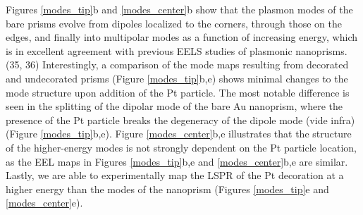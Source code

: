 \documentclass [11pt, proquest] {uwthesis}[2016/11/22]
\begin{document}
Figures \ref{modes_tip}b and \ref{modes_center}b show that the plasmon modes of the bare prisms evolve from dipoles localized to the corners, through those on the edges, and finally into multipolar modes as a function of increasing energy, which is in excellent agreement with previous EELS studies of plasmonic nanoprisms.(35, 36) Interestingly, a comparison of the mode maps resulting from decorated and undecorated prisms (Figure \ref{modes_tip}b,e) shows minimal changes to the mode structure upon addition of the Pt particle. The most notable difference is seen in the splitting of the dipolar mode of the bare Au nanoprism, where the presence of the Pt particle breaks the degeneracy of the dipole mode (vide infra) (Figure \ref{modes_tip}b,e). Figure \ref{modes_center}b,e illustrates that the structure of the higher-energy modes is not strongly dependent on the Pt particle location, as the EEL maps in Figures \ref{modes_tip}b,e and \ref{modes_center}b,e are similar. Lastly, we are able to experimentally map the LSPR of the Pt decoration at a higher energy than the modes of the nanoprism (Figures \ref{modes_tip}e and \ref{modes_center}e).
\end{document}
